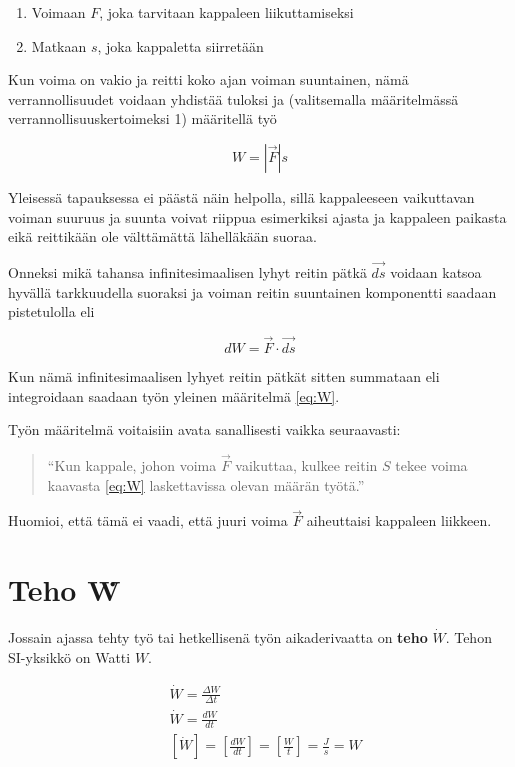 \documentclass[12pt,a4paper,finnish]{book}
\begin{document}
\begin{enumerate}
 \item Voimaan $F$, joka tarvitaan kappaleen liikuttamiseksi
 \item Matkaan $s$, joka kappaletta siirretään
\end{enumerate}

Kun voima on vakio ja reitti koko ajan voiman suuntainen, nämä verrannollisuudet voidaan yhdistää tuloksi ja 
(valitsemalla määritelmässä verrannollisuuskertoimeksi 1) määritellä työ

\begin{equation}
 W = |\vec{F}|s
\end{equation}

Yleisessä tapauksessa ei päästä näin helpolla, sillä kappaleeseen vaikuttavan voiman suuruus ja suunta voivat 
riippua esimerkiksi ajasta ja kappaleen paikasta eikä reittikään ole välttämättä lähelläkään suoraa. 

Onneksi 
mikä tahansa infinitesimaalisen lyhyt reitin pätkä $\vec{ds}$ voidaan katsoa hyvällä tarkkuudella suoraksi ja 
voiman reitin suuntainen komponentti saadaan pistetulolla eli

\begin{equation}
 dW = \vec{F} \cdot \vec{ds}
\end{equation}

Kun nämä infinitesimaalisen lyhyet reitin pätkät sitten summataan eli integroidaan saadaan työn yleinen määritelmä 
\ref{eq:W}.

Työn määritelmä voitaisiin avata sanallisesti vaikka seuraavasti:

\begin{quotation}
``Kun kappale, johon voima $\vec{F}$ vaikuttaa, kulkee 
reitin $S$ tekee voima kaavasta \ref{eq:W} laskettavissa olevan määrän työtä.''
\end{quotation}

 Huomioi, että tämä ei vaadi, että 
juuri voima $\vec{F}$ aiheuttaisi kappaleen liikkeen.

\section{Teho \.W}

Jossain ajassa tehty työ tai hetkellisenä työn aikaderivaatta on \textbf{teho} $\dot{W}$. 
Tehon SI-yksikkö on Watti $W$.

\begin{align}
 &\dot{W} = \frac{\Delta W}{\Delta t}\\ 
 &\dot{W} = \frac{dW}{dt}\\
 &[\dot{W}] = \left[\frac{dW}{dt}\right] = \left[\frac{W}{t}\right] = \frac{J}{s} = W
\end{align}
\end{document}
